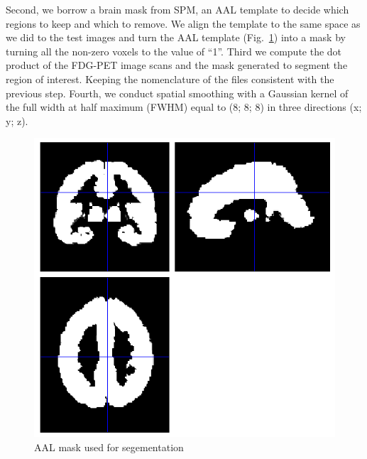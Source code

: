 Second, we borrow a brain mask from SPM, an AAL template to decide which regions to keep and which to remove. We align the template to the same space as we did to the test images and turn the AAL template (Fig.~\ref{fig:mask}) into a mask by turning all the non-zero voxels to the value of ``1''. Third we compute the dot product of the FDG-PET image scans and the mask generated to segment the region of interest. Keeping the nomenclature of the files consistent with the previous step. Fourth, we conduct spatial smoothing with a Gaussian kernel of the full width at half maximum (FWHM) equal to (8; 8; 8) in three directions (x; y; z).
\begin{figure}[h]
	\centering
	\includegraphics[width=\linewidth]{figures/mask}
	\caption[AAL Mask used for Segementation]{AAL mask used for segementation}
	\label{fig:mask}
\end{figure}

 
